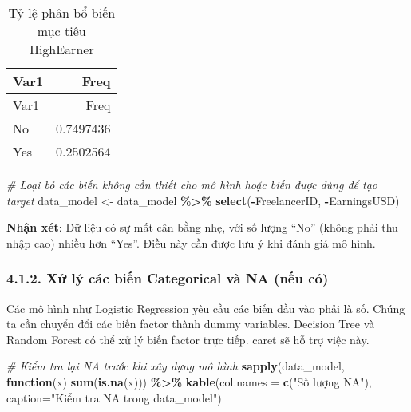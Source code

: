 \documentclass[
]{article}
\newenvironment{Shaded}{\begin{snugshade}}{\end{snugshade}}
\newcommand{\AttributeTok}[1]{\textcolor[rgb]{0.13,0.29,0.53}{#1}}
\newcommand{\CommentTok}[1]{\textcolor[rgb]{0.56,0.35,0.01}{\textit{#1}}}
\newcommand{\ControlFlowTok}[1]{\textcolor[rgb]{0.13,0.29,0.53}{\textbf{#1}}}
\newcommand{\FunctionTok}[1]{\textcolor[rgb]{0.13,0.29,0.53}{\textbf{#1}}}
\newcommand{\NormalTok}[1]{#1}
\newcommand{\OtherTok}[1]{\textcolor[rgb]{0.56,0.35,0.01}{#1}}
\newcommand{\SpecialCharTok}[1]{\textcolor[rgb]{0.81,0.36,0.00}{\textbf{#1}}}
\newcommand{\StringTok}[1]{\textcolor[rgb]{0.31,0.60,0.02}{#1}}
\begin{document}
\begin{Shaded}
\end{Shaded}

\begin{longtable}[]{@{}lr@{}}
\caption{Tỷ lệ phân bổ biến mục tiêu HighEarner}\tabularnewline
\toprule\noalign{}
Var1 & Freq \\
\midrule\noalign{}
\endfirsthead
\toprule\noalign{}
Var1 & Freq \\
\midrule\noalign{}
\endhead
\bottomrule\noalign{}
\endlastfoot
No & 0.7497436 \\
Yes & 0.2502564 \\
\end{longtable}

\begin{Shaded}
\begin{Highlighting}[]
\CommentTok{\# Loại bỏ các biến không cần thiết cho mô hình hoặc biến được dùng để tạo target}
\NormalTok{data\_model }\OtherTok{\textless{}{-}}\NormalTok{ data\_model }\SpecialCharTok{\%\textgreater{}\%} \FunctionTok{select}\NormalTok{(}\SpecialCharTok{{-}}\NormalTok{FreelancerID, }\SpecialCharTok{{-}}\NormalTok{EarningsUSD)}
\end{Highlighting}
\end{Shaded}

\textbf{Nhận xét}: Dữ liệu có sự mất cân bằng nhẹ, với số lượng ``No''
(không phải thu nhập cao) nhiều hơn ``Yes''. Điều này cần được lưu ý khi
đánh giá mô hình.

\subsubsection{4.1.2. Xử lý các biến Categorical và NA (nếu
có)}\label{xux1eed-luxfd-cuxe1c-biux1ebfn-categorical-vuxe0-na-nux1ebfu-cuxf3}

Các mô hình như Logistic Regression yêu cầu các biến đầu vào phải là số.
Chúng ta cần chuyển đổi các biến factor thành dummy variables. Decision
Tree và Random Forest có thể xử lý biến factor trực tiếp. caret sẽ hỗ
trợ việc này.

\begin{Shaded}
\begin{Highlighting}[]
\CommentTok{\# Kiểm tra lại NA trước khi xây dựng mô hình}
\FunctionTok{sapply}\NormalTok{(data\_model, }\ControlFlowTok{function}\NormalTok{(x) }\FunctionTok{sum}\NormalTok{(}\FunctionTok{is.na}\NormalTok{(x))) }\SpecialCharTok{\%\textgreater{}\%} \FunctionTok{kable}\NormalTok{(}\AttributeTok{col.names =} \FunctionTok{c}\NormalTok{(}\StringTok{"Số lượng NA"}\NormalTok{), }\AttributeTok{caption=}\StringTok{"Kiểm tra NA trong data\_model"}\NormalTok{)}
\end{Highlighting}
\end{Shaded}
\end{document}
